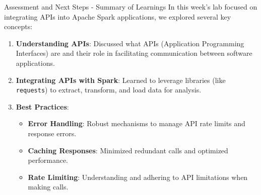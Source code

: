 \documentclass[aspectratio=169]{beamer}
\begin{document}
\begin{frame}[fragile]{Assessment and Next Steps - Summary of Learnings}
    In this week's lab focused on integrating APIs into Apache Spark applications, we explored several key concepts:
    
    \begin{enumerate}
        \item \textbf{Understanding APIs}: Discussed what APIs (Application Programming Interfaces) are and their role in facilitating communication between software applications.
        \item \textbf{Integrating APIs with Spark}: Learned to leverage libraries (like \texttt{requests}) to extract, transform, and load data for analysis.
        \item \textbf{Best Practices}:
        \begin{itemize}
            \item \textbf{Error Handling}: Robust mechanisms to manage API rate limits and response errors.
            \item \textbf{Caching Responses}: Minimized redundant calls and optimized performance.
            \item \textbf{Rate Limiting}: Understanding and adhering to API limitations when making calls.
        \end{itemize}
    \end{enumerate}
\end{frame}
\end{document}
